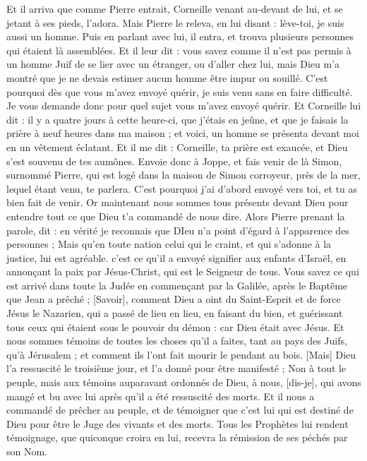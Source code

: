 \begin{multicols}{2}
Et il arriva que comme Pierre entrait, Corneille venant au-devant de lui, et se jetant à ses pieds, l'adora.
Mais Pierre le releva, en lui disant : lève-toi, je suis aussi un homme.
Puis en parlant avec lui, il entra, et trouva plusieurs personnes qui étaient là assemblées.
Et il leur dit : vous savez comme il n'est pas permis à un homme Juif de se lier avec un étranger, ou d'aller chez lui, mais Dieu m'a montré que je ne devais estimer aucun homme être impur ou souillé.
C'est pourquoi dès que vous m'avez envoyé quérir, je suis venu sans en faire difficulté. Je vous demande donc pour quel sujet vous m'avez envoyé quérir.
Et Corneille lui dit : il y a quatre jours à cette heure-ci, que j'étais en jeûne, et que je faisais la prière à neuf heures dans ma maison ; et voici, un homme se présenta devant moi en un vêtement éclatant.
Et il me dit : Corneille, ta prière est exaucée, et Dieu s'est souvenu de tes aumônes.
Envoie donc à Joppe, et fais venir de là Simon, surnommé Pierre, qui est logé dans la maison de Simon corroyeur, près de la mer, lequel étant venu, te parlera.
C'est pourquoi j'ai d'abord envoyé vers toi, et tu as bien fait de venir. Or maintenant nous sommes tous présents devant Dieu pour entendre tout ce que Dieu t'a commandé de nous dire.
Alors Pierre prenant la parole, dit : en vérité je reconnais que DIeu n'a point d'égard à l'apparence des personnes ;
Mais qu'en toute nation celui qui le craint, et qui s'adonne à la justice, lui est agréable.
c'est ce qu'il a envoyé signifier aux enfants d'Israël, en annonçant la paix par Jésus-Christ, qui est le Seigneur de tous.
Vous savez ce qui est arrivé dans toute la Judée en commençant par la Galilée, après le Baptême que Jean a prêché ;
[Savoir], comment Dieu a oint du Saint-Esprit et de force Jésus le Nazarien, qui a passé de lieu en lieu, en faisant du bien, et guérissant tous ceux qui étaient sous le pouvoir du démon : car Dieu était avec Jésus.
Et nous sommes témoins de toutes les choses qu'il a faites, tant au pays des Juifs, qu'à Jérusalem ; et comment ils l'ont fait mourir le pendant au bois.
[Mais] Dieu l'a ressuscité le troisième jour, et l'a donné pour être manifesté ;
Non à tout le peuple, mais aux témoins auparavant ordonnés de Dieu, à nous, [dis-je], qui avons mangé et bu avec lui après qu'il a été ressuscité des morts.
Et il nous a commandé de prêcher au peuple, et de témoigner que c'est lui qui est destiné de Dieu pour être le Juge des vivants et des morts.
Tous les Prophètes lui rendent témoignage, que quiconque croira en lui, recevra la rémission de ses péchés par son Nom.

\end{multicols}
